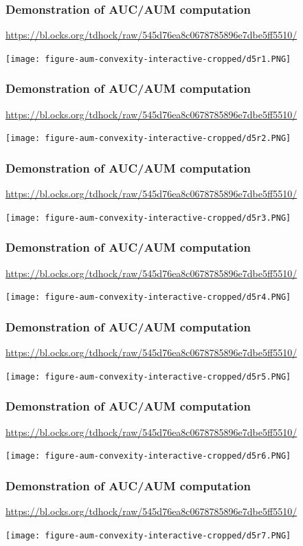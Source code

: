\documentclass[t]{beamer}
\begin{document}
\begin{frame}
  \frametitle{Demonstration of AUC/AUM computation}
  {\scriptsize\url{https://bl.ocks.org/tdhock/raw/545d76ea8c0678785896e7dbe5ff5510/}}

  \texttt{[image: figure-aum-convexity-interactive-cropped/d5r1.PNG]}
\end{frame}

\begin{frame}
  \frametitle{Demonstration of AUC/AUM computation}
  {\scriptsize\url{https://bl.ocks.org/tdhock/raw/545d76ea8c0678785896e7dbe5ff5510/}}

  \texttt{[image: figure-aum-convexity-interactive-cropped/d5r2.PNG]}
\end{frame}

\begin{frame}
  \frametitle{Demonstration of AUC/AUM computation}
  {\scriptsize\url{https://bl.ocks.org/tdhock/raw/545d76ea8c0678785896e7dbe5ff5510/}}

  \texttt{[image: figure-aum-convexity-interactive-cropped/d5r3.PNG]}
\end{frame}

\begin{frame}
  \frametitle{Demonstration of AUC/AUM computation}
  {\scriptsize\url{https://bl.ocks.org/tdhock/raw/545d76ea8c0678785896e7dbe5ff5510/}}

  \texttt{[image: figure-aum-convexity-interactive-cropped/d5r4.PNG]}
\end{frame}

\begin{frame}
  \frametitle{Demonstration of AUC/AUM computation}
  {\scriptsize\url{https://bl.ocks.org/tdhock/raw/545d76ea8c0678785896e7dbe5ff5510/}}

  \texttt{[image: figure-aum-convexity-interactive-cropped/d5r5.PNG]}
\end{frame}

\begin{frame}
  \frametitle{Demonstration of AUC/AUM computation}
  {\scriptsize\url{https://bl.ocks.org/tdhock/raw/545d76ea8c0678785896e7dbe5ff5510/}}

  \texttt{[image: figure-aum-convexity-interactive-cropped/d5r6.PNG]}
\end{frame}

\begin{frame}
  \frametitle{Demonstration of AUC/AUM computation}
  {\scriptsize\url{https://bl.ocks.org/tdhock/raw/545d76ea8c0678785896e7dbe5ff5510/}}

  \texttt{[image: figure-aum-convexity-interactive-cropped/d5r7.PNG]}
\end{frame}
\end{document}
